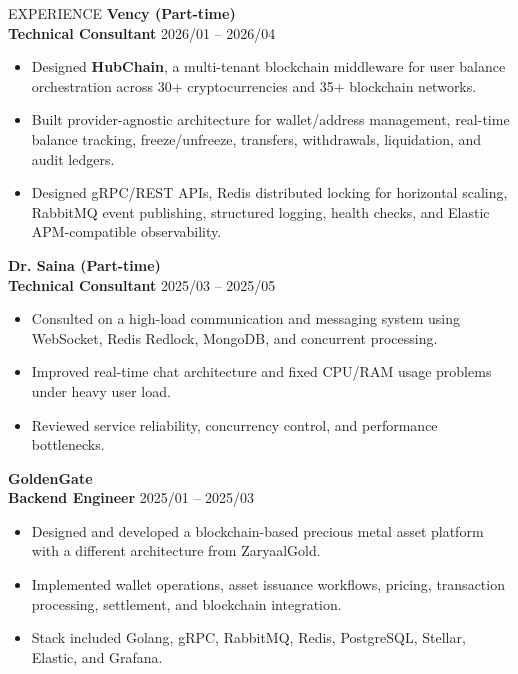 \documentclass{resume}
\begin{document}
\begin{rSection}{EXPERIENCE}
\textbf{Vency (Part-time)} \hfill \\
\textbf{Technical Consultant} \hfill 2026/01 -- 2026/04
\begin{itemize}
    \item Designed \textbf{HubChain}, a multi-tenant blockchain middleware for user balance orchestration across 30+ cryptocurrencies and 35+ blockchain networks.
    \item Built provider-agnostic architecture for wallet/address management, real-time balance tracking, freeze/unfreeze, transfers, withdrawals, liquidation, and audit ledgers.
    \item Designed gRPC/REST APIs, Redis distributed locking for horizontal scaling, RabbitMQ event publishing, structured logging, health checks, and Elastic APM-compatible observability.
\end{itemize}

\textbf{Dr. Saina (Part-time)} \hfill \\
\textbf{Technical Consultant} \hfill 2025/03 -- 2025/05
\begin{itemize}
    \item Consulted on a high-load communication and messaging system using WebSocket, Redis Redlock, MongoDB, and concurrent processing.
    \item Improved real-time chat architecture and fixed CPU/RAM usage problems under heavy user load.
    \item Reviewed service reliability, concurrency control, and performance bottlenecks.
\end{itemize}

\textbf{GoldenGate} \hfill \\
\textbf{Backend Engineer} \hfill 2025/01 -- 2025/03
\begin{itemize}
    \item Designed and developed a blockchain-based precious metal asset platform with a different architecture from ZaryaalGold.
    \item Implemented wallet operations, asset issuance workflows, pricing, transaction processing, settlement, and blockchain integration.
    \item Stack included Golang, gRPC, RabbitMQ, Redis, PostgreSQL, Stellar, Elastic, and Grafana.
\end{itemize}


\end{rSection}
\end{document}
